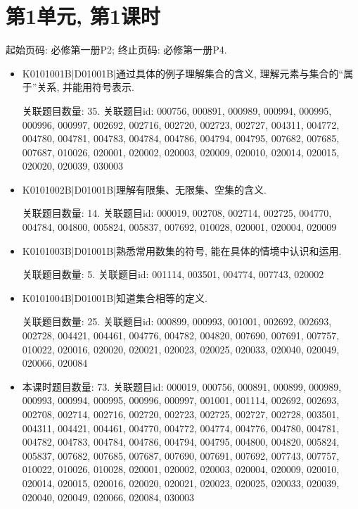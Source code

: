 \section*{第1单元, 第1课时}
起始页码: 必修第一册P2; 终止页码: 必修第一册P4.
\begin{itemize}
\item K0101001B|D01001B|通过具体的例子理解集合的含义, 理解元素与集合的``属于''关系, 并能用符号表示.

关联题目数量: 35. 关联题目id: 000756, 000891, 000989, 000994, 000995, 000996, 000997, 002692, 002716, 002720, 002723, 002727, 004311, 004772, 004780, 004781, 004783, 004784, 004786, 004794, 004795, 007682, 007685, 007687, 010026, 020001, 020002, 020003, 020009, 020010, 020014, 020015, 020020, 020039, 030003

\item K0101002B|D01001B|理解有限集、无限集、空集的含义.

关联题目数量: 14. 关联题目id: 000019, 002708, 002714, 002725, 004770, 004784, 004800, 005824, 005837, 007692, 010028, 020001, 020004, 020009

\item K0101003B|D01001B|熟悉常用数集的符号, 能在具体的情境中认识和运用.

关联题目数量: 5. 关联题目id: 001114, 003501, 004774, 007743, 020002

\item K0101004B|D01001B|知道集合相等的定义.

关联题目数量: 25. 关联题目id: 000899, 000993, 001001, 002692, 002693, 002728, 004421, 004461, 004776, 004782, 004820, 007690, 007691, 007757, 010022, 020016, 020020, 020021, 020023, 020025, 020033, 020040, 020049, 020066, 020084

\item 本课时题目数量: 73. 关联题目id: 000019, 000756, 000891, 000899, 000989, 000993, 000994, 000995, 000996, 000997, 001001, 001114, 002692, 002693, 002708, 002714, 002716, 002720, 002723, 002725, 002727, 002728, 003501, 004311, 004421, 004461, 004770, 004772, 004774, 004776, 004780, 004781, 004782, 004783, 004784, 004786, 004794, 004795, 004800, 004820, 005824, 005837, 007682, 007685, 007687, 007690, 007691, 007692, 007743, 007757, 010022, 010026, 010028, 020001, 020002, 020003, 020004, 020009, 020010, 020014, 020015, 020016, 020020, 020021, 020023, 020025, 020033, 020039, 020040, 020049, 020066, 020084, 030003

\end{itemize}

